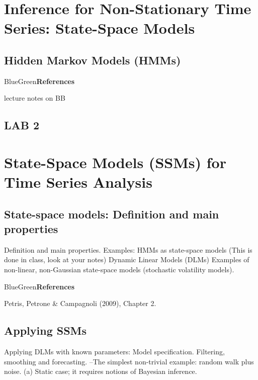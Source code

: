 \documentclass[dvipsnames,12pt]{book}
\begin{document}
    \part[Inference for Non-Stationary Time Series]{Inference for Non-Stationary Time Series: State-Space Models}

    \chapter{Hidden Markov Models (HMMs)}

            \begin{mybox}{BlueGreen}{\textbf{References}}

                lecture notes on BB
                
            \end{mybox}

    \chapter*{LAB 2}

\part{State-Space Models (SSMs) for Time Series Analysis}

    \chapter[State-space models]{State-space models: Definition and main properties}

        Definition and main properties.
        Examples:
        HMMs as state-space models (This is done in class, look at your notes)
        Dynamic Linear Models (DLMs)
        Examples of non-linear, non-Gaussian state-space models (stochastic volatility models).

        \begin{mybox}{BlueGreen}{\textbf{References}}

            Petris, Petrone \& Campagnoli (2009), Chapter 2.
            
        \end{mybox}

    \chapter{Applying SSMs}

        Applying DLMs with known parameters:
        Model specification.
        Filtering, smoothing and forecasting.
        --The simplest non-trivial example: random walk plus noise. (a) Static case; it requires notions of Bayesian inference.
\end{document}
